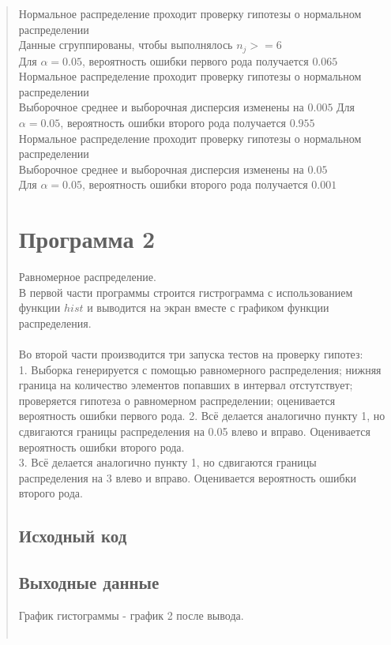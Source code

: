 \documentclass{article}
\begin{document}
\begin{quote}
	Нормальное распределение проходит проверку гипотезы о нормальном распределении \\
	Данные сгруппированы, чтобы выполнялось $n_j >= 6$ \\
	Для $\alpha = 0.05$, вероятность ошибки первого рода получается $0.065$ \\

	Нормальное распределение проходит проверку гипотезы о нормальном распределении \\
	Выборочное среднее и выборочная дисперсия изменены на $0.005$
	Для $\alpha = 0.05$, вероятность ошибки второго рода получается $0.955$ \\

	Нормальное распределение проходит проверку гипотезы о нормальном распределении \\
	Выборочное среднее и выборочная дисперсия изменены на $0.05$ \\
	Для $\alpha = 0.05$, вероятность ошибки второго рода получается $0.001$
\section{Программа 2}
	Равномерное распределение. \\
	В первой части программы строится гистрограмма с использованием функции $hist$ и выводится на экран вместе с графиком функции распределения. \\ \\
	Во второй части производится три запуска тестов на проверку гипотез: \\
	1. Выборка генерируется с помощью равномерного распределения; нижняя граница на количество элементов попавших в интервал отстутствует; проверяется гипотеза о равномерном распределении; оценивается вероятность ошибки первого рода.
	2. Всё делается аналогично пункту 1, но сдвигаются границы распределения на 0.05 влево и вправо. Оценивается вероятность ошибки второго рода. \\
	3. Всё делается аналогично пункту 1, но сдвигаются границы распределения на 3 влево и вправо. Оценивается вероятность ошибки второго рода.
\subsection{Исходный код}
	
\subsection{Выходные данные}
	График гистограммы - график 2 после вывода. \\ \\


\end{quote}
\end{document}
